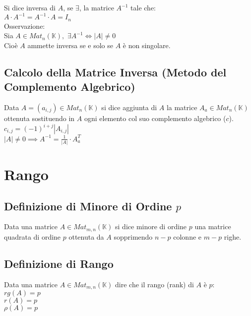 \documentclass[a4paper, twoside, italian, 11pt]{book}
\newcommand{\detm}[1] {\left | #1 \right |}
\newcommand{\K}{\mathbb K}
\begin{document}
Si dice inversa di $A$, se $\exists$, la matrice $A^{-1}$ tale che: \\

\noindent
$A \cdot A^{-1} = A^{-1} \cdot A = I_n$ \\

\noindent
Osservazione: \\
Sia $A \in Mat_n(\K),$ $\exists A^{-1} \iff \detm A \neq 0$ \\

\noindent
Cioè $A$ ammette inversa se e solo se $A$ è non singolare.


\subsection{Calcolo della Matrice Inversa (Metodo del Complemento Algebrico)}

Data $A = (a_{i,j}) \in Mat_n(\K)$ si dice aggiunta di $A$ la matrice $A_a \in Mat_n(\K)$ ottenuta sostituendo in $A$ ogni elemento col suo complemento algebrico ($c$). \\

\noindent
$c_{i,j} = (-1)^{i+j} \detm{A_{i,j}}$ \\

\noindent
$\detm A \neq 0 \implies A^{-1} = \frac{1}{\detm A} \cdot A_a^T$



\section{Rango}



\subsection{Definizione di Minore di Ordine $p$}

Data una matrice $A \in Mat_{m,n}(\K)$ si dice minore di ordine $p$ una matrice quadrata di ordine $p$ ottenuta da $A$ sopprimendo $n-p$ colonne e $m-p$ righe.


\subsection{Definizione di Rango}

Data una matrice $A \in Mat_{m,n}(\K)$ dire che il rango (rank) di $A$ è $p$: \\

\noindent
$rg(A) = p$ \\
$r(A) = p$ \\
$\rho(A) = p$ \\
\end{document}
